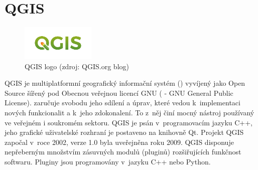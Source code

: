 \section{QGIS}

\begin{figure}[H]
    \centering
      \includegraphics[width=100pt]{./pictures/qgis.png}
      \caption[QGIS logo]{QGIS logo (zdroj: QGIS.org blog)}
      \label{fig:qgis}
\end{figure}
 
QGIS je multiplatformní geografický informační systém () vyvíjený jako Open Source šířený pod Obecnou veřejnou licencí GNU ( - GNU General Public License).  zaručuje svobodu jeho sdílení a úprav, které vedou k~implementaci nových funkcionalit a k~jeho zdokonalení. To z~něj činí mocný nástroj používaný ve veřejném i soukromém sektoru. QGIS je psán v~programovacím jazyku C++, jeho grafické uživatelské rozhraní je postaveno na knihovně Qt. Projekt QGIS započal v~roce 2002, verze 1.0 byla uveřejněna roku 2009. QGIS disponuje nepřeberným množstvím zásuvných modulů (pluginů) rozšiřujících funkčnost softwaru. Pluginy jsou programovány v~jazyku C++ nebo Python. \cite{masteringQgis}




   
